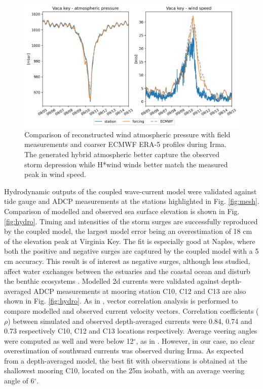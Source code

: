 \documentclass[11pt,a4paper]{article}
\begin{document}
\begin{figure}
    \centering
    \includegraphics[width=.95\textwidth]{fig/validation_met_2.png}
    \caption{Comparison of reconstructed wind atmospheric pressure with field measurements and coarser ECMWF ERA-5 profiles during Irma. The generated hybrid atmospheric better capture the observed storm depression while H*wind winds better match the measured peak in wind speed.}
    \label{fig:forcings}
\end{figure}

Hydrodynamic outputs of the coupled wave-current model were validated against tide gauge and ADCP measurements at the stations highlighted in Fig. \ref{fig:mesh}. Comparison of modelled and observed sea surface elevation is shown in Fig. \ref{fig:hydro}. Timing and intensities of the    storm surges are successfully reproduced by the coupled model, the largest model error being an overestimation of 18 cm of the elevation peak at Virginia Key. The fit is especially good at Naples, where both the positive and negative surges are captured by the coupled model with a 5 cm accuracy. This result is of interest as negative surges, although less studied, affect water exchanges between the estuaries and the coastal ocean and disturb the benthic ecosystems \citep{liu2020impacts}. Modelled 2d currents were validated against depth-averaged ADCP measurements at mooring station C10, C12 and C13 are also shown in Fig. \ref{fig:hydro}. As in \citep{liu2020impacts}, vector correlation analysis \citep{kundu1976ekman} is performed to compare modelled and observed current velocity vectors. Correlation coefficients ($\rho$) between simulated and observed depth-averaged currents were 0.84, 0.74 and 0.73 respectively C10, C12 and C13 locations respectively. Average veering angles were computed as well and were below 12$^\circ$, as in \citep{liu2020impacts}. However, in our case, no clear overestimation of southward currents was observed during Irma. As expected from a depth-averaged model, the best fit with observations is obtained at the shallowest mooring C10, located on the 25m isobath, with an average veering angle of 6$^\circ$. 
\end{document}
